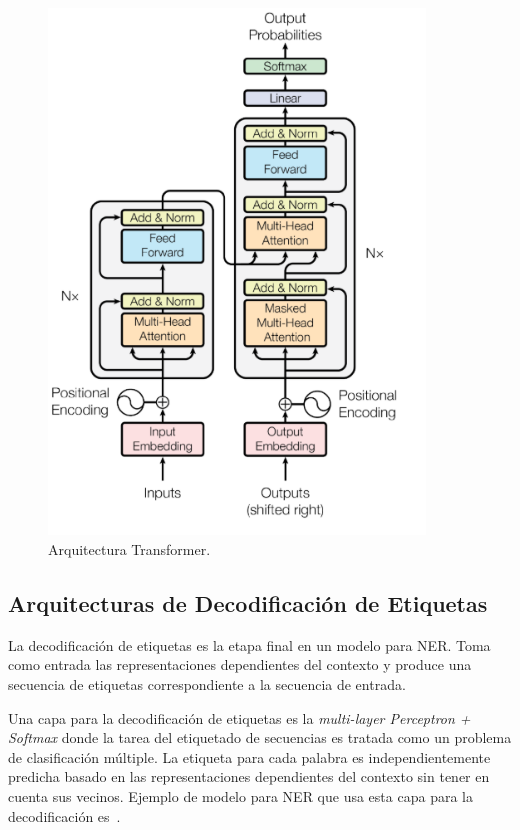 \begin{figure}[h!]
	\centering
	\includegraphics[width = 10cm]{Graphics/Transformer.png}
	\caption{Arquitectura Transformer.}\label{fig:transformer}
\end{figure}


\subsection{Arquitecturas de Decodificaci\'on de Etiquetas}

La decodificaci\'on de etiquetas es la etapa final en un modelo para NER. Toma como entrada las representaciones dependientes del contexto y produce una secuencia de etiquetas correspondiente a la secuencia de entrada.

Una capa para la decodificaci\'on de etiquetas es la \emph{multi-layer Perceptron + Softmax} donde la tarea del etiquetado de secuencias es tratada como un problema de clasificaci\'on m\'ultiple. La etiqueta para cada palabra es independientemente predicha basado en las representaciones dependientes del contexto sin tener en cuenta sus vecinos. Ejemplo de modelo para NER que usa esta capa para la decodificaci\'on es~\cite{li2017leveraging}.


